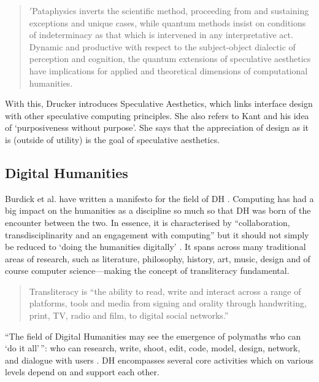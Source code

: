 \begin{quotation}
  $'$Pataphysics inverts the scientific method, proceeding from and sustaining exceptions and unique cases, while quantum methods insist on conditions of indeterminacy as that which is intervened in any interpretative act. Dynamic and productive with respect to the subject-object dialectic of perception and cognition, the quantum extensions of speculative aesthetics have implications for applied and theoretical dimensions of computational humanities. 
\end{quotation}

With this, Drucker introduces Speculative Aesthetics, which links interface design with other speculative computing principles. She also refers to Kant and his idea of `purposiveness without purpose'. She says that the appreciation of design as it is (outside of utility) is the goal of speculative aesthetics.


\subsection{Digital Humanities}
\label{s:digithuman}

Burdick et al. have written a manifesto for the field of \acf{DH} \autocite*{Burdick2012}. Computing has had a big impact on the humanities as a discipline so much so that \ac{DH} was born of the encounter between the two. In essence, it is characterised by ``collaboration, transdisciplinarity and an engagement with computing'' but it should not simply be reduced to `doing the humanities digitally' \autocite*{Burdick2012}. It spans across many traditional areas of research, such as literature, philosophy, history, art, music, design and of course computer science---making the concept of transliteracy fundamental.

\begin{quotation}
  Transliteracy is ``the ability to read, write and interact across a range of platforms, tools and media from signing and orality through handwriting, print, TV, radio and film, to digital social networks.'' 
\end{quotation}

``The field of Digital Humanities may see the emergence of polymaths who can `do it all'\,'': who can research, write, shoot, edit, code, model, design, network, and dialogue with users \autocite{Burdick2012}. \ac{DH} encompasses several core activities which on various levels depend on and support each other.

